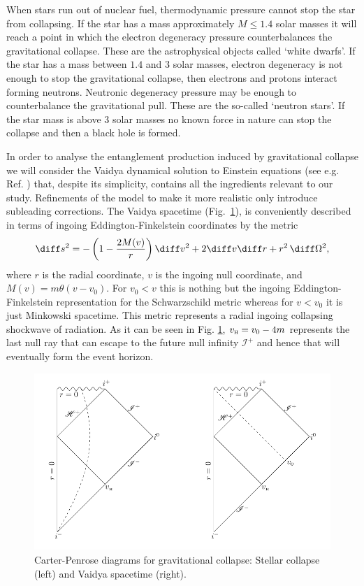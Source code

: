 When stars run out of nuclear fuel, thermodynamic pressure cannot stop the star from collapsing. If the star has a mass approximately $M\le 1.4$ solar masses it will reach a point in which the electron degeneracy pressure counterbalances the gravitational collapse. These are the astrophysical objects called `white dwarfs'. If the star has a mass between $1.4$ and $3$ solar masses, electron degeneracy is not enough to stop the gravitational collapse, then electrons and protons interact forming neutrons. Neutronic degeneracy pressure may be enough to counterbalance the gravitational pull. These are the so-called `neutron stars'. If the star mass is above 3 solar masses no known force in nature can stop the collapse and then a black hole is formed.

In order to analyse the entanglement production induced by gravitational
collapse we will consider the Vaidya dynamical solution to
Einstein equations (see e.g. Ref. \cite{NavarroSalas})  that, despite its
simplicity, contains all the ingredients relevant to our study. Refinements
of the model to make it more realistic only introduce subleading
corrections. The Vaidya spacetime (Fig.~\ref{fig:vaidya}), is conveniently
described in terms of ingoing Eddington-Finkelstein coordinates by the
metric
\begin{equation}
\diff s^2=-\left(1-\frac{2M(v)}{r}\right)\diff v^2+2\diff v\diff r+r^2 \,
\diff \Omega^2,
\end{equation}
where $r$ is the radial coordinate, $v$ is the ingoing null coordinate, and
$M(v)=m\theta(v-v_0)$. For $v_0<v$ this is nothing but the ingoing
Eddington-Finkelstein representation for the Schwarzschild metric
whereas for $v<v_0$ it is just Minkowski spacetime. This metric
represents a radial  ingoing collapsing shockwave of radiation. As it can
be seen in Fig. \ref{fig:vaidya}, $v_\textsc{h}=v_0-4m$ represents the
last null ray that can escape to the future null infinity $\mathscr{I}^+$
and hence that will eventually form the event horizon.

\begin{figure}[h]
\begin{center}
\includegraphics[width=.9\columnwidth]{fig-collapse-vaidya}
\end{center}
\caption{Carter-Penrose diagrams for gravitational collapse: Stellar collapse (left)
and Vaidya spacetime (right).}
\label{fig:vaidya}
\end{figure}

